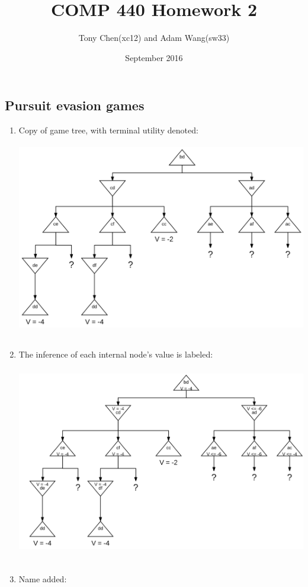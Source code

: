 \documentclass[11pt]{article}
\title{COMP 440 Homework 2}
\author{Tony Chen(xc12) and Adam Wang(sw33)}
\date{September 2016}
\begin{document}
\begin{onehalfspace}
\section{Pursuit evasion games}
 \renewcommand{\theenumi}{\alph{enumi}}
    \begin{enumerate}
    \item Copy of game tree, with terminal utility denoted:\\
     \includegraphics[width=16cm, height=9cm]{1_a.png}\\
     \item The inference of each internal node's value is labeled:\\
     \includegraphics[width=16cm, height=9cm]{1_b.png}\\
     \item Name added:\\

\end{enumerate}
\end{onehalfspace}
\end{document}
